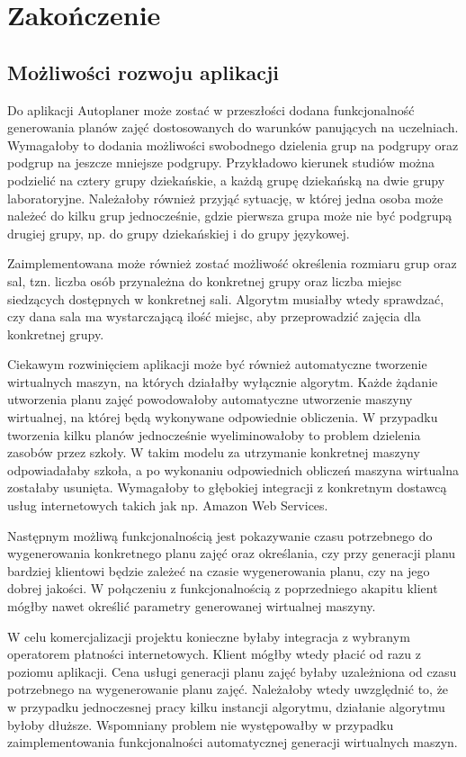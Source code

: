 
\chapter{Zakończenie}

\section{Możliwości rozwoju aplikacji}

Do aplikacji Autoplaner może zostać w przeszłości dodana funkcjonalność generowania planów zajęć dostosowanych do warunków panujących na uczelniach. Wymagałoby to dodania możliwości swobodnego dzielenia grup na podgrupy oraz podgrup na jeszcze mniejsze podgrupy. Przykładowo kierunek studiów można podzielić na cztery grupy dziekańskie, a każdą grupę dziekańską na dwie grupy laboratoryjne. Należałoby również przyjąć sytuację, w której jedna osoba może należeć do kilku grup jednocześnie, gdzie pierwsza grupa może nie być podgrupą drugiej grupy, np. do grupy dziekańskiej i do grupy językowej.

Zaimplementowana może również zostać możliwość określenia rozmiaru grup oraz sal, tzn. liczba osób przynależna do konkretnej grupy oraz liczba miejsc siedzących dostępnych w konkretnej sali. Algorytm musiałby wtedy sprawdzać, czy dana sala ma wystarczającą ilość miejsc, aby przeprowadzić zajęcia dla konkretnej grupy.

Ciekawym rozwinięciem aplikacji może być również automatyczne tworzenie wirtualnych maszyn, na których działałby wyłącznie algorytm. Każde żądanie utworzenia planu zajęć powodowałoby automatyczne utworzenie maszyny wirtualnej, na której będą wykonywane odpowiednie obliczenia. W przypadku tworzenia kilku planów jednocześnie wyeliminowałoby to problem dzielenia zasobów przez szkoły. W takim modelu za utrzymanie konkretnej maszyny odpowiadałaby szkoła, a po wykonaniu odpowiednich obliczeń maszyna wirtualna zostałaby usunięta. Wymagałoby to głębokiej integracji z konkretnym dostawcą usług internetowych takich jak np. Amazon Web Services.

Następnym możliwą funkcjonalnością jest pokazywanie czasu potrzebnego do wygenerowania konkretnego planu zajęć oraz określania, czy przy generacji planu bardziej klientowi będzie zależeć na czasie wygenerowania planu, czy na jego dobrej jakości. W połączeniu z funkcjonalnością z poprzedniego akapitu klient mógłby nawet określić parametry generowanej wirtualnej maszyny.

W celu komercjalizacji projektu konieczne byłaby integracja z wybranym operatorem płatności internetowych. Klient mógłby wtedy płacić od razu z poziomu aplikacji. Cena usługi generacji planu zajęć byłaby uzależniona od czasu potrzebnego na wygenerowanie planu zajęć. Należałoby wtedy uwzględnić to, że w przypadku jednoczesnej pracy kilku instancji algorytmu, działanie algorytmu byłoby dłuższe. Wspomniany problem nie występowałby w przypadku zaimplementowania funkcjonalności automatycznej generacji wirtualnych maszyn.
